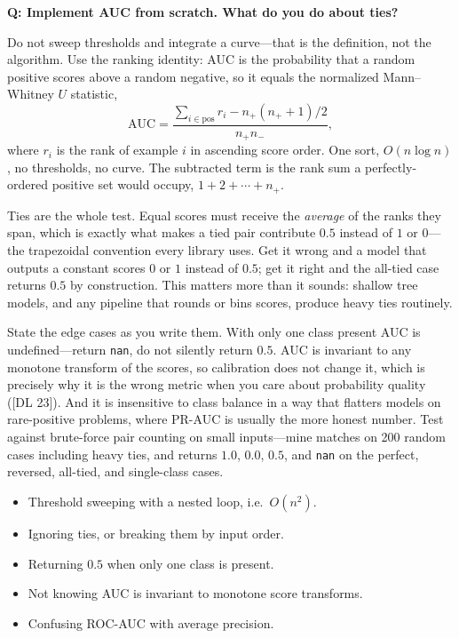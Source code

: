 \begin{interviewq}
\textbf{Q: Implement AUC from scratch. What do you do about ties?}

 \quad {} \quad \badgefreq{\freqmed}

\stronganswer

Do not sweep thresholds and integrate a curve---that is the definition, not the algorithm. Use the ranking identity: AUC is the probability that a random positive scores above a random negative, so it equals the normalized Mann--Whitney $U$ statistic,
\[
\mathrm{AUC} = \frac{\sum_{i \in \text{pos}} r_i - n_+(n_+ + 1)/2}{n_+ n_-},
\]
where $r_i$ is the rank of example $i$ in ascending score order. One sort, $O(n \log n)$, no thresholds, no curve. The subtracted term is the rank sum a perfectly-ordered positive set would occupy, $1 + 2 + \cdots + n_+$.

Ties are the whole test. Equal scores must receive the \emph{average} of the ranks they span, which is exactly what makes a tied pair contribute $0.5$ instead of $1$ or $0$---the trapezoidal convention every library uses. Get it wrong and a model that outputs a constant scores $0$ or $1$ instead of $0.5$; get it right and the all-tied case returns $0.5$ by construction. This matters more than it sounds: shallow tree models, and any pipeline that rounds or bins scores, produce heavy ties routinely.

State the edge cases as you write them. With only one class present AUC is undefined---return \texttt{nan}, do not silently return $0.5$. AUC is invariant to any monotone transform of the scores, so calibration does not change it, which is precisely why it is the wrong metric when you care about probability quality ([DL 23]). And it is insensitive to class balance in a way that flatters models on rare-positive problems, where PR-AUC is usually the more honest number. Test against brute-force pair counting on small inputs---mine matches on 200 random cases including heavy ties, and returns $1.0$, $0.0$, $0.5$, and \texttt{nan} on the perfect, reversed, all-tied, and single-class cases.

\redflags
\begin{itemize}
    \item Threshold sweeping with a nested loop, i.e.\ $O(n^2)$.
    \item Ignoring ties, or breaking them by input order.
    \item Returning $0.5$ when only one class is present.
    \item Not knowing AUC is invariant to monotone score transforms.
    \item Confusing ROC-AUC with average precision.
\end{itemize}


\end{interviewq}
